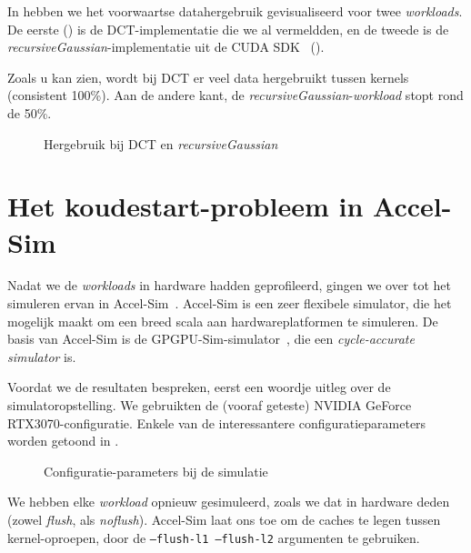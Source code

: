\documentclass[5p,numvwe]{elsarticle}
\begin{document}
    In  hebben we het voorwaartse datahergebruik gevisualiseerd voor twee \textit{workloads}.
    De eerste () is de DCT-implementatie die we al vermeldden, en de tweede is de \textit{recursiveGaussian}-implementatie uit de CUDA SDK~\cite{samples} ().

    Zoals u kan zien, wordt bij DCT er veel data hergebruikt tussen kernels (consistent 100\%).
    Aan de andere kant, de \textit{recursiveGaussian}-\textit{workload} stopt rond de 50\%.

    \begin{figure}[ht]
        \centering
        \caption{Hergebruik bij DCT en \textit{recursiveGaussian}}
        \label{fig:fwd-hw}
    \end{figure}

    \section{Het koudestart-probleem in Accel-Sim}\label{sec:sim}
    Nadat we de \textit{workloads} in hardware hadden geprofileerd, gingen we over tot het simuleren ervan in Accel-Sim~\cite{accelsim}.
    Accel-Sim is een zeer flexibele simulator, die het mogelijk maakt om een breed scala aan hardwareplatformen te simuleren.
    De basis van Accel-Sim is de GPGPU-Sim-simulator~\cite{gpgpu-sim}, die een \textit{cycle-accurate simulator} is.

    Voordat we de resultaten bespreken, eerst een woordje uitleg over de simulatoropstelling.
    We gebruikten de (vooraf geteste) NVIDIA GeForce RTX3070-configuratie.
    Enkele van de interessantere configuratieparameters worden getoond in .

    \begin{figure}[h]
        \centering
        \caption{Configuratie-parameters bij de simulatie}
        \label{fig:config-sim}
    \end{figure}

    We hebben elke \textit{workload} opnieuw gesimuleerd, zoals we dat in hardware deden (zowel \textit{flush}, als \textit{noflush}).
    Accel-Sim laat ons toe om de caches te legen tussen kernel-oproepen, door de \texttt{--flush-l1 --flush-l2} argumenten te gebruiken.
\end{document}

